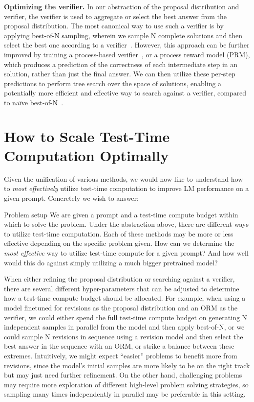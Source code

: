 \textbf{Optimizing the verifier.} In our abstraction of the proposal distribution and verifier, the verifier is used to aggregate or select the best answer from the proposal distribution. The most canonical way to use such a verifier is by applying best-of-N sampling, wherein we sample N complete solutions and then select the best one according to a verifier~\citep{cobbe2021training}. However, this approach can be further improved by training a process-based verifier~\citep{lightman2023lets}, or a process reward model (PRM), which produces a prediction of the correctness of each intermediate step in an solution, rather than just the final answer. We can then utilize these per-step predictions to perform tree search over the space of solutions, enabling a potentially more efficient and effective way to search against a verifier, compared to na\"ive best-of-N~\citep{yao2023tree,feng2024alphazerolike,chen2024alphamath}.

\vspace{-0.25cm}
\section{How to Scale Test-Time Computation Optimally}
\label{sec:compute_optimal}
\vspace{-0.25cm}

Given the unification of various methods, we would now like to understand how to \emph{most effectively} utilize test-time computation to improve LM performance on a given prompt. Concretely we wish to answer:
\begin{AIbox}{Problem setup}
    We are given a prompt and a test-time compute budget within which to solve the problem. Under the abstraction above, there are different ways to utilize test-time computation. Each of these methods may be more or less effective depending on the specific problem given. How can we determine the \emph{most effective} way to utilize test-time compute for a given prompt? And how well would this do against simply utilizing a much bigger pretrained model?
\end{AIbox}
When either refining the proposal distribution or searching against a verifier, there are several different hyper-parameters that can be adjusted to determine how a test-time compute budget should be allocated. For example, when using a model finetuned for revisions as the proposal distribution and an ORM as the verifier, we could either spend the full test-time compute budget on generating N independent samples in parallel from the model and then apply best-of-N, or we could sample N revisions in sequence using a revision model and then select the best answer in the sequence with an ORM, or strike a balance between these extremes.
Intuitively, we might expect ``easier'' problems to benefit more from revisions, since the model's initial samples are more likely to be on the right track but may just need further refinement. On the other hand, challenging problems may require more exploration of different high-level problem solving strategies, so sampling many times independently in parallel may be preferable in this setting.

